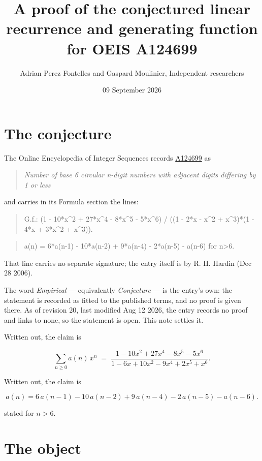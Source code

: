 \documentclass[11pt]{article}
\title{A proof of the conjectured linear recurrence and generating function for OEIS A124699}
\author{Adrian Perez Fontelles and Gaspard Moulinier, Independent researchers}
\date{09 September 2026}
\theoremstyle{definition}
\begin{document}
\maketitle
\section{The conjecture}

The Online Encyclopedia of Integer Sequences records \href{https://oeis.org/A124699}{A124699} as

\begin{quote}\itshape Number of base 6 circular n-digit numbers with adjacent digits differing by 1 or less\end{quote}

and carries in its Formula section the lines:

\begin{quote}\ttfamily G.f.: (1 - 10*x\textasciicircum{}2 + 27*x\textasciicircum{}4 - 8*x\textasciicircum{}5 - 5*x\textasciicircum{}6) / ((1 - 2*x - x\textasciicircum{}2 + x\textasciicircum{}3)*(1 - 4*x + 3*x\textasciicircum{}2 + x\textasciicircum{}3)).\end{quote}

\begin{quote}\ttfamily a(n) = 6*a(n-1) - 10*a(n-2) + 9*a(n-4) - 2*a(n-5) - a(n-6) for n>6.\end{quote}

That line carries no separate signature; the entry itself is by R. H. Hardin (Dec 28 2006).

The word {\itshape Empirical} --- equivalently {\itshape Conjecture} --- is the entry's own: the statement is recorded as fitted to the published terms, and no proof is given there. As of revision 20, last modified Aug 12 2026, the entry records no proof and links to none, so the statement is open. This note settles it.

Written out, the claim is

\[\sum_{n \ge 0} a(n)\,x^n \;=\; \frac{1 - 10x^{2} + 27x^{4} - 8x^{5} - 5x^{6}}{1 - 6x + 10x^{2} - 9x^{4} + 2x^{5} + x^{6}}.\]

Written out, the claim is

\[a(n) = 6\,a(n-1) - 10\,a(n-2) + 9\,a(n-4) - 2\,a(n-5) - a(n-6).\]

stated for $n > 6$.

\section{The object}
\end{document}
